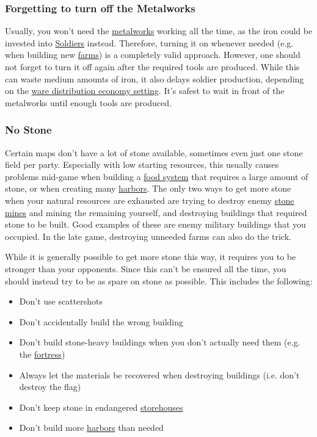\documentclass[12pt]{article}
\begin{document}
\subsubsection{Forgetting to turn off the Metalworks}
\label{sec:forgettingmetalworks}

Usually, you won't need the \hyperref[sec:metalworks]{metalworks} working all the time, as the iron could be invested into \hyperref[sec:soldiers]{Soldiers} instead. Therefore, turning it on whenever needed (e.g. when building new \hyperref[sec:farm]{farms}) is a completely valid approach. However, one should not forget to turn it off again after the required tools are produced. While this can waste medium amounts of iron, it also delays soldier production, depending on the \hyperref[sec:waredistribution]{ware distribution economy setting}. It's safest to wait in front of the metalworks until enough tools are produced.

\subsubsection{No Stone}
\label{sec:nostone}

Certain maps don't have a lot of stone available, sometimes even just one stone field per party. Especially with low starting resources, this usually causes problems mid-game when building a \hyperref[sec:foodsystems]{food system} that requires a large amount of stone, or when creating many \hyperref[sec:harbor]{harbors}. The only two ways to get more stone when your natural resources are exhausted are trying to destroy enemy \hyperref[sec:stonemine]{stone mines} and mining the remaining yourself, and destroying buildings that required stone to be built. Good examples of these are enemy military buildings that you occupied. In the late game, destroying unneeded farms can also do the trick.

While it is generally possible to get more stone this way, it requires you to be stronger than your opponents. Since this can't be ensured all the time, you should instead try to be as spare on stone as possible. This includes the following:

\begin{itemize}
    \item Don't use scattershots
    \item Don't accidentally build the wrong building
    \item Don't build stone-heavy buildings when you don't actually need them (e.g. the \hyperref[sec:fortress]{fortress})
    \item Always let the materials be recovered when destroying buildings (i.e. don't destroy the flag)
    \item Don't keep stone in endangered \hyperref[sec:storehouse]{storehouses}
    \item Don't build more \hyperref[sec:harbor]{harbors} than needed
\end{itemize}
\end{document}

